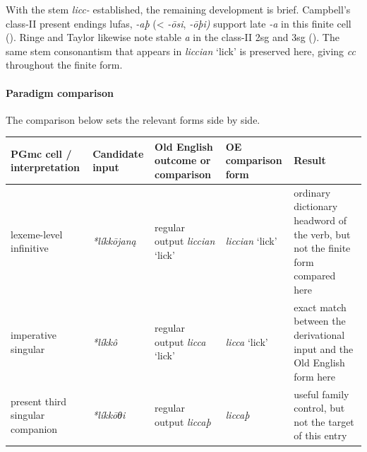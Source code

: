 \documentclass[
  british,
  a4paper,
]{article}
\newcounter{none} %
\begin{document}
With the stem \emph{licc-} established, the remaining development is
brief. Campbell's class-II present endings lufas, \emph{-aþ}
(\textless{} \emph{-ōsi}, \emph{-ōþi)} support late \emph{-a} in this
finite cell ().
Ringe and Taylor likewise note stable \emph{a} in the class-II 2sg and
3sg (). The
same stem consonantism that appears in \emph{liccian} `lick' is
preserved here, giving \emph{cc} throughout the finite form.

\paragraph{Paradigm comparison}\label{paradigm-comparison-11}

The comparison below sets the relevant forms side by side.

{\def\LTcaptype{none} %
\begin{longtable}[]{@{}
  >{\raggedright\arraybackslash}p{}
  >{\raggedright\arraybackslash}p{}
  >{\raggedright\arraybackslash}p{}
  >{\raggedright\arraybackslash}p{}
  >{\raggedright\arraybackslash}p{}@{}}
\toprule\noalign{}
\begin{minipage}[b]{\linewidth}\raggedright
PGmc cell / interpretation
\end{minipage} & \begin{minipage}[b]{\linewidth}\raggedright
Candidate input
\end{minipage} & \begin{minipage}[b]{\linewidth}\raggedright
Old English outcome or comparison
\end{minipage} & \begin{minipage}[b]{\linewidth}\raggedright
OE comparison form
\end{minipage} & \begin{minipage}[b]{\linewidth}\raggedright
Result
\end{minipage} \\
\midrule\noalign{}
\endhead
\bottomrule\noalign{}
\endlastfoot
lexeme-level infinitive & {\emph{*líkkōjaną}} & regular output
{\emph{liccian}} `lick' & {\emph{liccian}} `lick' & ordinary dictionary
headword of the verb, but not the finite form compared here \\
imperative singular & {\emph{*líkkô}} & regular output {\emph{licca}}
`lick' & {\emph{licca}} `lick' & exact match between the derivational
input and the Old English form here \\
present third singular companion & {\emph{*líkkōθi}} & regular output
{\emph{liccaþ}} & {\emph{liccaþ}} & useful family control, but not the
target of this entry \\
\end{longtable}
}
\end{document}
